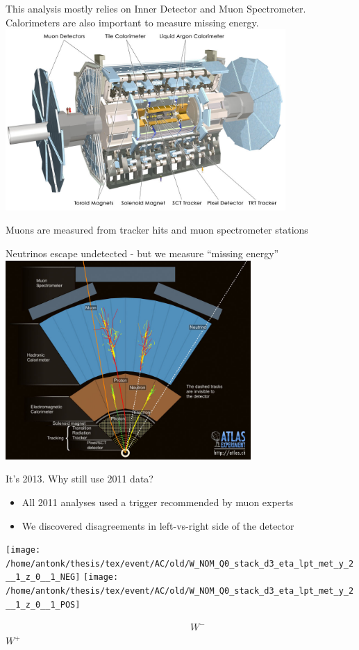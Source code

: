 {
\centering
This analysis mostly relies on Inner Detector and Muon Spectrometer. \\
Calorimeters are also important to measure missing energy. \\
\includegraphics[width=0.8\textwidth]{dates/mtg/figures/atlas/ATLAS}

}

{
\centering
\iteb
\item Muons are measured from tracker hits and muon spectrometer stations
\item Neutrinos escape undetected - but we measure ``missing energy''
\itee
\includegraphics[width=0.7\textwidth]{dates/mtg/figures/wz/particles}

}

\begin{frame}{It's 2013. Why still use 2011 data?}
\begin{itemize}
\item All 2011 analyses used a trigger recommended by muon experts
\item We discovered disagreements in left-vs-right side of the detector
\end{itemize}

\centering
\texttt{[image: /home/antonk/thesis/tex/event/AC/old/W\_NOM\_Q0\_stack\_d3\_eta\_lpt\_met\_y\_2\_\_1\_z\_0\_\_1\_NEG]}
\texttt{[image: /home/antonk/thesis/tex/event/AC/old/W\_NOM\_Q0\_stack\_d3\_eta\_lpt\_met\_y\_2\_\_1\_z\_0\_\_1\_POS]}

~~~~~~~~~~~~~~~~~~~~~~~~~~~~~~~~~~~~~~$W^-$~~~~~~~~~~~~~~~~~~~~~~~~~~~~$W^+$
\end{frame}

